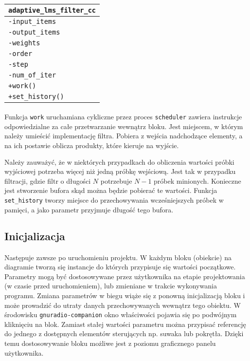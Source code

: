 \paragraph{}
\begin{tabular}{|l|} \hline
\texttt{adaptive\_lms\_filter\_cc} \\
\hline
\texttt{-input\_items} \\
\texttt{-output\_items} \\
\texttt{-weights} \\
\texttt{-order} \\
\texttt{-step} \\
\texttt{-num\_of\_iter} \\
\hline
\texttt{+work()} \\
\texttt{+set\_history()} \\
\hline
\end{tabular}

\paragraph{}
Funkcja \texttt{work} uruchamiana cykliczne przez proces \texttt{scheduler} zawiera instrukcje odpowiedzialne za całe przetwarzanie wewnątrz bloku. 
Jest miejscem, w którym należy umieścić implementację filtra. 
Pobiera z wejścia nadchodzące elementy, a na ich postawie oblicza produkty, które kieruje na wyjście.

Należy zauważyć, że w niektórych przypadkach do obliczenia wartości próbki wyjściowej potrzeba więcej niż jedną próbkę wejściową. 
Jest tak w przypadku filtracji, gdzie filtr o długości $N$ potrzebuje $N-1$ próbek minionych. 
Konieczne jest stworzenie bufora skąd można będzie pobierać te wartości. 
Funkcja \texttt{set\_history} tworzy miejsce do przechowywania wcześniejszych próbek w pamięci, a jako parametr przyjmuje długość tego bufora.

\subsection{Inicjalizacja}
\paragraph{}
Następuje zawsze po uruchomieniu projektu. 
W każdym bloku (obiekcie) na diagramie tworzą się instancje do których przypisuje się wartości początkowe.
Parametry mogą być dostosowywane przez użytkownika na etapie projektowania (w czasie przed uruchomieniem), lub zmieniane w trakcie wykonywania programu.
Zmiana parametrów w biegu wiąże się z ponowną inicjalizacją bloku i może prowadzić do utraty danych przechowywanych wewnątrz tego obiektu. W środowisku \texttt{gnuradio-companion} okno właściwości pojawia się po podwójnym kliknięciu na blok. Zamiast stałej wartości parametru można przypisać referencję do jednego z dostępnych elementów sterujących np. suwaka lub pokrętła. Dzięki temu dostosowywanie bloku możliwe jest z poziomu graficznego panelu użytkownika.

